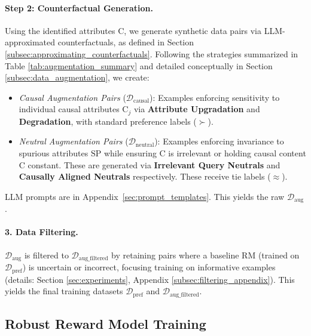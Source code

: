 \paragraph{Step 2: Counterfactual Generation.}
Using the identified attributes $\mathrm{C}$, we generate synthetic data pairs via LLM-approximated counterfactuals, as defined in Section \ref{subsec:approximating_counterfactuals}. Following the strategies summarized in Table \ref{tab:augmentation_summary} and detailed conceptually in Section \ref{subsec:data_augmentation}, we create:
\vspace{-0.1in}
\begin{itemize}[itemsep=0pt, left=10pt]
    \item \textit{Causal Augmentation Pairs} ($\mathcal{D}_{\mathrm{causal}}$): Examples enforcing sensitivity to individual causal attributes $\mathrm{C}_j$ via \textbf{Attribute Upgradation} and \textbf{Degradation}, with  standard preference labels ($\succ$).
    \item \textit{Neutral Augmentation Pairs} ($\mathcal{D}_{\mathrm{neutral}}$): Examples enforcing invariance to spurious attributes $\mathrm{SP}$ while ensuring $\mathrm{C}$ is irrelevant or holding causal content $\mathrm{C}$ constant.   These are generated via \textbf{Irrelevant Query Neutrals} and \textbf{Causally Aligned Neutrals} respectively. These receive tie labels ($\approx$).
\end{itemize}
LLM prompts are in Appendix~\ref{sec:prompt_templates}. This yields the raw $\mathcal{D}_{\mathrm{aug}}$.

\vspace{-0.1in}
\paragraph{3. Data Filtering.} $\mathcal{D}_{\mathrm{aug}}$ is filtered to $\mathcal{D}_{\mathrm{aug\_filtered}}$ by retaining pairs where a baseline RM (trained on $\mathcal{D}_{\mathrm{pref}}$) is uncertain or incorrect, focusing training on informative examples (details: Section \ref{sec:experiments}, Appendix \ref{subsec:filtering_appendix}). This yields the final training datasets $\mathcal{D}_{\mathrm{pref}}$ and $\mathcal{D}_{\mathrm{aug\_filtered}}$.

\subsection{Robust Reward Model Training}
\label{subsec:training_phase}

